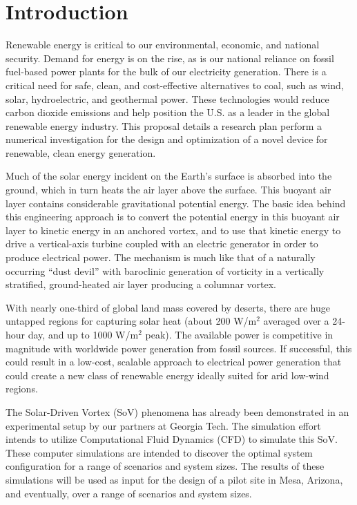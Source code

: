 \section{Introduction}

Renewable energy is critical to our environmental, economic, and
national security. Demand for energy is on the rise, as is our national
reliance on fossil fuel-based power plants for the bulk of our
electricity generation. There is a critical need for safe, clean, and
cost-effective alternatives to coal, such as wind, solar, hydroelectric,
and geothermal power\cite{arpa-e}. These technologies would reduce carbon dioxide
emissions and help position the U.S. as a leader in the global renewable
energy industry. 
%
%
This proposal details a research plan perform a numerical investigation
for the design and optimization of a novel device for renewable, clean
energy generation. 

Much of the solar energy incident on the Earth's surface is absorbed
into the ground, which in turn heats the air layer above the surface.
This buoyant air layer contains considerable gravitational potential
energy. The basic idea behind this engineering approach is to convert the 
potential energy in this buoyant air layer to kinetic energy in an
anchored vortex, and to use that kinetic energy to drive a
vertical-axis turbine coupled with an electric generator in order to
produce electrical power. The mechanism is much like that of a naturally
%
%
occurring ``dust devil'' with baroclinic generation of vorticity in a
vertically stratified, ground-heated air layer producing a columnar vortex. 

With nearly one-third of global land mass covered by deserts, there are huge
untapped regions for capturing solar heat (about 200 W/$\text{m}^2$ averaged over
a 24-hour day, and up to 1000 W/$\text{m}^2$ peak).  The available power is
competitive in magnitude with worldwide power generation from fossil
sources. If successful, this could result in a low-cost, scalable
approach to electrical power generation that could create a new class of
renewable energy ideally suited for arid low-wind regions. 

The Solar-Driven Vortex (SoV) phenomena has already been demonstrated in
an experimental setup by our partners at Georgia Tech. The simulation
effort intends to utilize Computational Fluid Dynamics (CFD) to simulate
this SoV. These computer simulations are intended to discover the optimal
system configuration for a range of scenarios and system sizes. The
results of these simulations will be used as input for the design of a
pilot site in Mesa, Arizona, and eventually, over a range of
scenarios and system sizes. 

